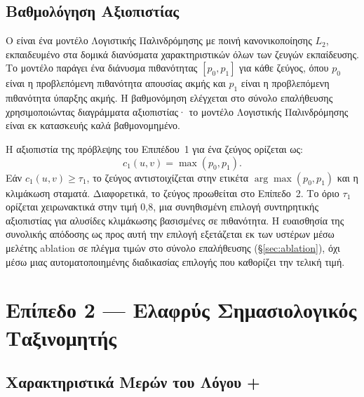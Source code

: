 \subsection{Βαθμολόγηση Αξιοπιστίας}
\label{subsec:confidence-scoring}

Ο  είναι ένα μοντέλο Λογιστικής Παλινδρόμησης με ποινή
κανονικοποίησης $L_2$, εκπαιδευμένο στα δομικά διανύσματα χαρακτηριστικών όλων των
ζευγών εκπαίδευσης.
Το μοντέλο παράγει ένα διάνυσμα πιθανότητας $[p_0, p_1]$ για
κάθε ζεύγος, όπου $p_0$ είναι η προβλεπόμενη πιθανότητα απουσίας ακμής και $p_1$
είναι η προβλεπόμενη πιθανότητα ύπαρξης ακμής.
Η βαθμονόμηση ελέγχεται στο σύνολο
επαλήθευσης χρησιμοποιώντας διαγράμματα αξιοπιστίας· το μοντέλο Λογιστικής
Παλινδρόμησης είναι εκ κατασκευής καλά βαθμονομημένο.

Η αξιοπιστία της πρόβλεψης του Επιπέδου~1 για ένα ζεύγος ορίζεται ως:
\begin{equation}
    c_1(u, v) = \max(p_0, p_1).
    \label{eq:confidence-tier1}
\end{equation}
Εάν $c_1(u, v) \geq \tau_1$, το ζεύγος αντιστοιχίζεται στην ετικέτα $\arg\max(p_0,
p_1)$ και η κλιμάκωση σταματά.
Διαφορετικά, το ζεύγος προωθείται στο Επίπεδο~2.
Το όριο $\tau_1$ ορίζεται χειρωνακτικά στην τιμή 0{,}8, μια συνηθισμένη επιλογή
συντηρητικής αξιοπιστίας για αλυσίδες κλιμάκωσης βασισμένες σε πιθανότητα.
Η
ευαισθησία της συνολικής απόδοσης ως προς αυτή την επιλογή εξετάζεται εκ των
υστέρων μέσω μελέτης ablation σε πλέγμα τιμών στο σύνολο επαλήθευσης
(\S\ref{sec:ablation}), όχι μέσω μιας αυτοματοποιημένης διαδικασίας επιλογής που
καθορίζει την τελική τιμή.


\section{Επίπεδο 2 --- Ελαφρύς Σημασιολογικός Ταξινομητής}
\label{sec:tier2}

\subsection{Χαρακτηριστικά Μερών του Λόγου + }
\label{subsec:pos-features}

